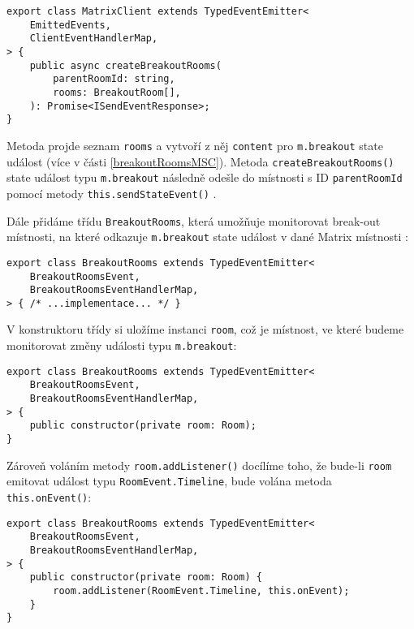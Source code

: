 \begin{verbatim}
export class MatrixClient extends TypedEventEmitter<
	EmittedEvents,
	ClientEventHandlerMap,
> {
	public async createBreakoutRooms(
		parentRoomId: string,
		rooms: BreakoutRoom[],
	): Promise<ISendEventResponse>;
}
\end{verbatim}

Metoda projde seznam \texttt{rooms} a vytvoří z něj
\texttt{content} pro \texttt{m.breakout} state událost (více
v části \ref{breakoutRoomsMSC}). Metoda
\texttt{createBreakoutRooms()} state událost typu
\texttt{m.breakout} následně odešle do místnosti s ID
\texttt{parentRoomId} pomocí metody
\texttt{this.sendStateEvent()}
\parencite{GitHub-MatrixJSSDK-BreakoutRooms}.

Dále přidáme třídu \texttt{BreakoutRooms}, která umožňuje
monitorovat break-out místnosti, na které odkazuje \texttt{m.breakout}
state událost v dané Matrix místnosti
\parencite{GitHub-MatrixJSSDK-BreakoutRooms}:

\begin{verbatim}
export class BreakoutRooms extends TypedEventEmitter<
	BreakoutRoomsEvent,
	BreakoutRoomsEventHandlerMap,
> { /* ...implementace... */ }
\end{verbatim}

V konstruktoru třídy si uložíme instanci \texttt{room}, což je
místnost, ve které budeme monitorovat změny události typu
\texttt{m.breakout}:

\begin{verbatim}
export class BreakoutRooms extends TypedEventEmitter<
	BreakoutRoomsEvent,
	BreakoutRoomsEventHandlerMap,
> {
	public constructor(private room: Room);
}
\end{verbatim}

Zároveň voláním metody \texttt{room.addListener()} docílíme
toho, že bude-li \texttt{room} emitovat událost typu
\texttt{RoomEvent.Timeline}, bude volána metoda
\texttt{this.onEvent()}:

\begin{verbatim}
export class BreakoutRooms extends TypedEventEmitter<
	BreakoutRoomsEvent,
	BreakoutRoomsEventHandlerMap,
> {
	public constructor(private room: Room) {
		room.addListener(RoomEvent.Timeline, this.onEvent);
	}
}
\end{verbatim}

